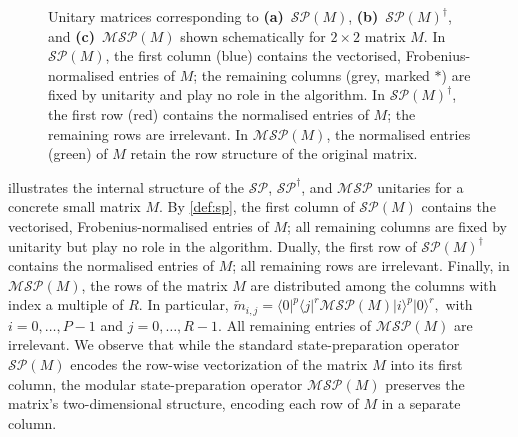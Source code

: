\documentclass[a4paper,UKenglish,cleveref,autoref,thm-restate]{socg-lipics-v2021}
\providecommand{\ket}[1]{\lvert #1 \rangle}
\providecommand{\bra}[1]{\langle #1 \rvert}
\newcommand{\SP}{\mathcal{SP}}        %
\newcommand{\MSP}{\mathcal{MSP}} %
\begin{document}
\begin{figure}[t]
\begin{minipage}[t]{0.30\linewidth}
    \subcaption{$\MSP(M)$ for $M\in\mathbb{R}^{2\times 2}$ where $\tilde{m}_{i,j} = \frac{m_{i,j}}{\|M\|_F}$.}
  \end{minipage}
  \caption{Unitary matrices corresponding to
    \textbf{(a)}~$\SP(M)$,   \textbf{(b)}~$\SP(M)^\dagger$, and \textbf{(c)}~$\MSP(M)$
    shown schematically for $2\times 2$ matrix $M$.
    In $\SP(M)$, the first column (blue) contains the vectorised,
    Frobenius-normalised entries of $M$; the remaining columns (grey, marked $\ast$) are fixed by unitarity and play no role in the algorithm.
    In $\SP(M)^\dagger$, the first row (red) contains the normalised entries of $M$; the remaining rows are irrelevant. In $\MSP(M)$, the normalised entries (green) of $M$ retain the row structure of the original matrix.
    }
  \label{fig:viz}
\end{figure}

 illustrates the internal structure of the $\SP$, $\SP^\dagger$, and $\MSP$ unitaries for a concrete small matrix $M$. By \cref{def:sp}, the first column of $\SP(M)$ contains the vectorised, Frobenius-normalised entries of $M$; all remaining columns are fixed by unitarity but play no role in the algorithm. Dually, the first row of $\SP(M)^\dagger$ contains the normalised entries of $M$; all remaining rows are irrelevant. Finally, in $\MSP(M)$, the rows of the matrix $M$ are distributed among the columns with index a multiple of $R$. In particular, $\tilde m_{i,j}= \bra{0}^p\bra{j}^r\MSP(M)\ket{i}^p\ket{0}^r,$ with $i=0, \ldots, P-1$ and $j=0, \ldots, R-1.$ All remaining entries of $\MSP(M)$ are irrelevant. We observe that while the standard state-preparation operator $\SP(M)$ encodes the row-wise vectorization of the matrix $M$ into its first column, the modular state-preparation operator $\MSP(M)$ preserves the matrix's two-dimensional structure, encoding each row of $M$ in a separate column.
\end{document}
